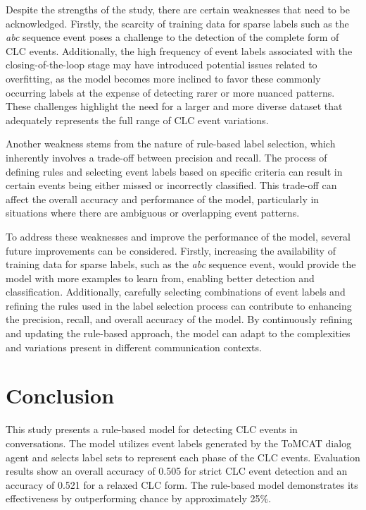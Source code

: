 \documentclass[11pt]{article}
\begin{document}
Despite the strengths of the study, there are certain weaknesses that need to be acknowledged. Firstly, the scarcity of training data for sparse labels such as the \textit{abc} sequence event poses a challenge to the detection of the complete form of CLC events. Additionally, the high frequency of event labels associated with the closing-of-the-loop stage may have introduced potential issues related to overfitting, as the model becomes more inclined to favor these commonly occurring labels at the expense of detecting rarer or more nuanced patterns. These challenges highlight the need for a larger and more diverse dataset that adequately represents the full range of CLC event variations.

Another weakness stems from the nature of rule-based label selection, which inherently involves a trade-off between precision and recall. The process of defining rules and selecting event labels based on specific criteria can result in certain events being either missed or incorrectly classified. This trade-off can affect the overall accuracy and performance of the model, particularly in situations where there are ambiguous or overlapping event patterns.

To address these weaknesses and improve the performance of the model, several future improvements can be considered. Firstly, increasing the availability of training data for sparse labels, such as the \textit{abc} sequence event, would provide the model with more examples to learn from, enabling better detection and classification. Additionally, carefully selecting combinations of event labels and refining the rules used in the label selection process can contribute to enhancing the precision, recall, and overall accuracy of the model. By continuously refining and updating the rule-based approach, the model can adapt to the complexities and variations present in different communication contexts.

\section{Conclusion}
This study presents a rule-based model for detecting CLC events in conversations. The model utilizes event labels generated by the ToMCAT dialog agent and selects label sets to represent each phase of the CLC events. Evaluation results show an overall accuracy of 0.505 for strict CLC event detection and an accuracy of 0.521 for a relaxed CLC form. The rule-based model demonstrates its effectiveness by outperforming chance by approximately 25\%.
\end{document}
